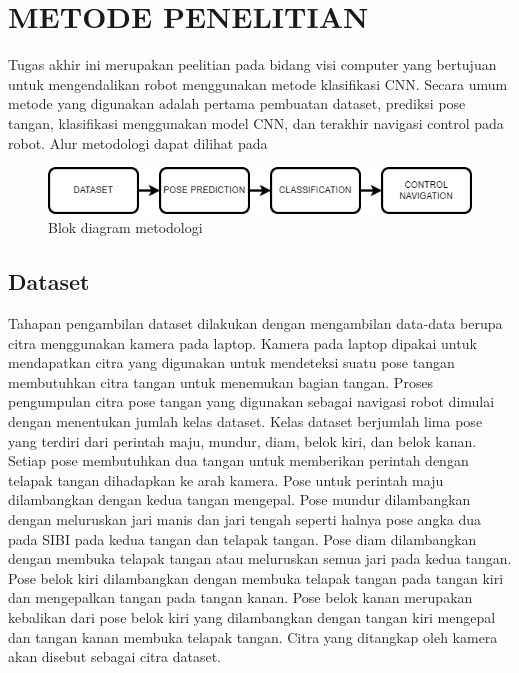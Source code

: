 \chapter{METODE PENELITIAN}


Tugas akhir ini merupakan peelitian pada bidang visi computer yang bertujuan untuk mengendalikan robot menggunakan metode klasifikasi CNN. Secara umum metode yang digunakan adalah pertama pembuatan dataset, prediksi pose tangan, klasifikasi menggunakan model CNN, dan terakhir navigasi control pada robot. Alur metodologi dapat dilihat pada

\begin{figure}[!h]
  \centering
	\includegraphics[width=1\linewidth]{../Gambar/metodologi.png}
	\caption{Blok diagram metodologi}
	\label{fig:metodologi}
\end{figure}

\section{Dataset}
\label{sec:deskripsisistem}

Tahapan pengambilan dataset dilakukan dengan mengambilan data-data berupa citra menggunakan kamera pada laptop. Kamera pada laptop dipakai untuk mendapatkan citra yang digunakan untuk mendeteksi suatu pose tangan membutuhkan citra tangan untuk menemukan bagian tangan. Proses pengumpulan citra pose tangan yang digunakan sebagai navigasi robot  dimulai dengan menentukan jumlah kelas dataset. Kelas dataset berjumlah lima pose yang terdiri dari perintah maju, mundur, diam, belok kiri, dan belok kanan. Setiap pose membutuhkan dua tangan untuk memberikan perintah dengan telapak tangan dihadapkan ke arah kamera. Pose untuk perintah maju dilambangkan dengan kedua tangan mengepal. Pose mundur dilambangkan dengan meluruskan jari manis dan jari tengah seperti halnya pose angka dua pada SIBI pada kedua tangan dan telapak tangan.  Pose diam dilambangkan dengan membuka telapak tangan atau meluruskan semua jari pada kedua tangan.  Pose belok kiri dilambangkan dengan membuka telapak tangan pada tangan kiri dan mengepalkan tangan pada tangan kanan. Pose belok kanan merupakan kebalikan dari pose belok kiri yang dilambangkan dengan tangan kiri mengepal dan tangan kanan membuka telapak tangan. Citra yang ditangkap oleh kamera akan disebut sebagai citra dataset.


